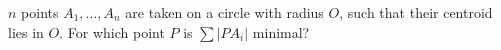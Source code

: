 $n$ points $A_1, \ldots, A_n$ are taken on a circle with radius $O$, such that their centroid lies in $O$. For which point $P$ is $\sum |PA_i|$ minimal?
